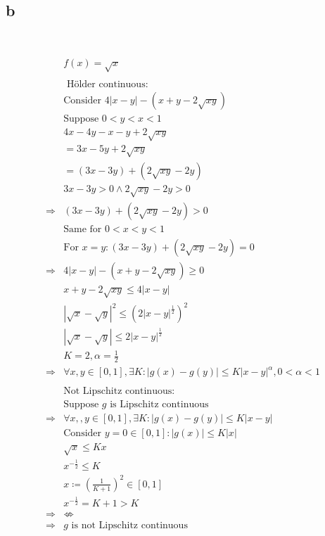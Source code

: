 \documentclass{article}
\begin{document}
~

\subsection*{b}

~

\begin{align*}
    &f(x)=\sqrt{x}\\
    &\\
    &\text{ H\"older continuous}:\\
    &\text{Consider }4|x-y|-(x+y-2\sqrt{xy})\\
    &\text{Suppose }0<y<x<1\\
    &4x-4y-x-y+2\sqrt{xy}\\
    &=3x-5y+2\sqrt{xy}\\
    &=(3x-3y)+(2\sqrt{xy}-2y)\\
    &3x-3y>0\land2\sqrt{xy}-2y>0\\
    \Rightarrow&(3x-3y)+(2\sqrt{xy}-2y)>0\\
    &\text{Same for }0<x<y<1\\
    &\text{For }x=y:(3x-3y)+(2\sqrt{xy}-2y)=0\\
    \Rightarrow&4|x-y|-(x+y-2\sqrt{xy})\geqslant0\\
    &x+y-2\sqrt{xy}\leqslant4|x-y|\\
    &|\sqrt{x}-\sqrt{y}|^2\leqslant(2|x-y|^\frac{1}{2})^2\\
    &|\sqrt{x}-\sqrt{y}|\leqslant2|x-y|^\frac{1}{2}\\
    &K=2,\alpha=\frac{1}{2}\\
    \Rightarrow&\forall x,y\in [0,1],\exists K:|g(x)-g(y)|\leqslant K|x-y|^\alpha,0<\alpha<1\\
    &\\
    &\text{Not Lipschitz continuous}:\\
    &\text{Suppose }g\text{ is Lipschitz continuous}\\
    \Rightarrow&\forall x,,y\in [0,1],\exists K:|g(x)-g(y)|\leqslant K|x-y|\\
    &\text{Consider }y=0\in[0,1]:|g(x)|\leqslant K|x|\\
    &\sqrt{x}\leqslant Kx\\
    &x^{-\frac{1}{2}}\leqslant K\\
    &x\coloneqq (\frac{1}{K+1})^2\in[0,1]\\
    &x^{-\frac{1}{2}}=K+1>K\\
    \Rightarrow&\nLeftrightarrow\\
    \Rightarrow&g\text{ is not Lipschitz continuous}\\
\end{align*}
\end{document}
